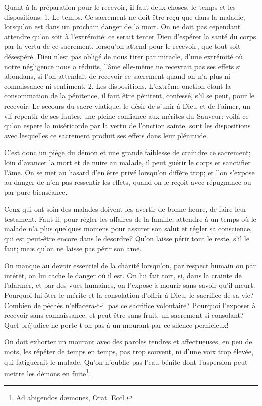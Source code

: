\documentclass[instructions.tex]{subfiles}
\begin{document}
\secundo Quant à la préparation pour le recevoir, il faut deux choses, le temps et les dispositions. 1. Le temps. Ce sacrement ne doit être reçu que dans la maladie, lorsqu'on est dans un prochain danger de la mort. On ne doit pas cependant attendre qu'on soit à l'extrémité: ce serait tenter Dieu d'espérer la santé du corps par la vertu de ce sacrement, lorsqu'on attend pour le recevoir, que tout soit désespéré. Dieu n'est pas obligé de nous tirer par miracle, d'une extrémité où notre négligence nous a réduits, l'âme elle-même ne recevrait pas ses effets si abondans, si l'on attendait de recevoir ce sacrement quand on n'a plus ni connaissance ni sentiment. 2. Les dispositions. L'extrême-onction étant la consommation de la pénitence, il faut être pénitent, confessé, s'il se peut, pour le recevoir. Le secours du sacre viatique, le désir de s'unir à Dieu et de l'aimer, un vif repentir de ses fautes, une pleine confiance aux mérites du Sauveur: voilà ce qu'on espere la miséricorde par la vertu de l'onction sainte, sont les dispositions avec lesquelles ce sacrement produit ses effets dans leur plénitude.

C'est donc un piège du démon et une grande faiblesse de craindre ce sacrement; loin d'avancer la mort et de nuire au malade, il peut guérir le corps et sanctifier l'âme. On se met au hasard d'en être privé lorsqu'on diffère trop; et l'on s'expose au danger de n'en pas ressentir les effets, quand on le reçoit avec répugnance ou par pure bienséance.

Ceux qui ont soin des malades doivent les avertir de bonne heure, de faire leur testament. Faut-il, pour régler les affaires de la famille, attendre à un temps où le malade n'a plus quelques momens pour assurer son salut et régler sa conscience, qui est peut-être encore dans le desordre? Qu'on laisse périr tout le reste, s'il le faut; mais qu'on ne laisse pas périr son ame.

On manque au devoir essentiel de la charité lorsqu'on, par respect humain ou par intérêt, on lui cache le danger où il est. On lui fait tort, si, dans la crainte de l'alarmer, et par des vues humaines, on l'expose à mourir sans savoir qu'il meurt. Pourquoi lui ôter le mérite et la consolation d'offrir à Dieu, le sacrifice de sa vie? Combien de péchés n'effacera-t-il pas ce sacrifice volontaire? Pourquoi l'exposer à recevoir sans connaissance, et peut-être sans fruit, un sacrement si consolant? Quel préjudice ne porte-t-on pas à un mourant par ce silence pernicieux!

On doit exhorter un mourant avec des paroles tendres et affectueuses, en peu de mots, les répéter de temps en temps, pas trop souvent, ni d'une voix trop élevée, qui fatiguerait le malade. Qu'on n'oublie pas l'eau bénite dont l'aspersion peut mettre les démons en fuite\footnote{Ad abigendos dæmones, Orat. Eccl.}.
\end{document}
